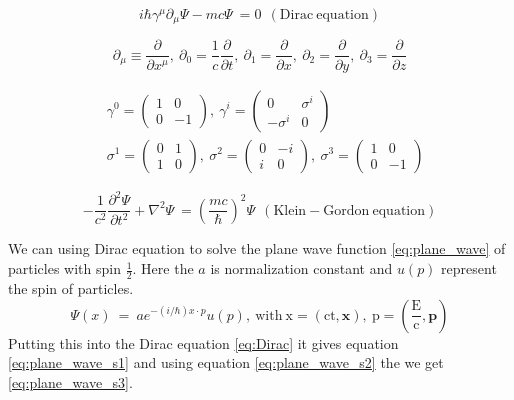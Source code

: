 \begin{equation}
i\hbar \gamma^{\mu}\partial_{\mu}\Psi-mc\Psi~=0 ~~\mathrm{(Dirac~equation)}
\label{eq:Dirac}
\end{equation}

\begin{equation}
\partial_{\mu}\equiv\frac{\partial}{\partial x^{\mu}},~
\partial_{0}=\frac{1}{c}\frac{\partial}{\partial t},~\partial_{1}=\frac{\partial}{\partial x},~\partial_{2}=\frac{\partial}{\partial y},~\partial_{3}=\frac{\partial}{\partial z}
\label{eq:partial}
\end{equation}

\begin{equation}
\begin{split}
&\gamma^{0}=\begin{pmatrix} 1 & 0 \\ 0 & -1 \end{pmatrix},~
\gamma^{i}=\begin{pmatrix} 0 & \sigma^{i} \\ -\sigma^{i} & 0 \end{pmatrix} \\
&\sigma^{1}=\begin{pmatrix} 0 & 1 \\ 1 & 0 \end{pmatrix},~\sigma^{2}=\begin{pmatrix} 0 & -i \\ i & 0 \end{pmatrix},~\sigma^{3}=\begin{pmatrix} 1 & 0 \\ 0 & -1 \end{pmatrix}
\end{split}
\label{eq:gamma_matrix}
\end{equation}

\begin{equation}
-\frac{1}{c^{2}}\frac{\partial^{2}\Psi}{\partial t^{2}}+\nabla^{2}\Psi~=(\frac{mc}{\hbar})^{2}\Psi ~~\mathrm{(Klein-Gordon~equation)}
\label{eq:KG}
\end{equation}

We can using Dirac equation to solve the plane wave function \ref{eq:plane_wave} of particles with spin $\frac{1}{2}$. Here the $a$ is normalization constant and $u(p)$ represent the spin of particles.
\begin{equation}
\Psi(x)~=~ae^{-(i/\hbar)x\cdot p}u(p),~\mathrm{with~x=(ct,\mathbf{x}),~p=(\frac{E}{c},\mathbf{p})}
\label{eq:plane_wave}
\end{equation}
Putting this into the Dirac equation \ref{eq:Dirac} it gives equation \ref{eq:plane_wave_s1} and using equation \ref{eq:plane_wave_s2} the we get \ref{eq:plane_wave_s3}.

